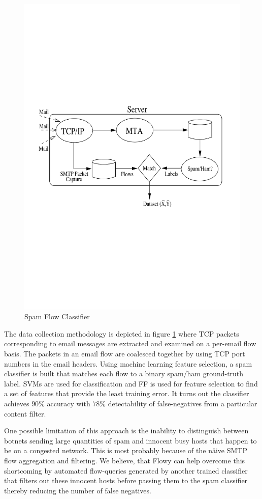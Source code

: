 \begin{figure}[h!]
\begin{center}
  \includegraphics* [width=0.7\linewidth]{figures/email-flow}
  \caption{Spam Flow Classifier \cite{rbeverly:2008}}
  \label{fig:email-flow}
\end{center}
\end{figure}
The data collection methodology is depicted in figure \ref{fig:email-flow} where \ac{TCP} packets corresponding to email messages are extracted and examined on a per-email flow basis. The packets in an email flow are coalesced together by using \ac{TCP} port numbers in the email headers. Using machine learning feature selection,  a spam classifier is built that matches each flow to a binary spam/ham ground-truth label. \ac{SVMs} \cite{vvapnik:1995} are used for classification and \ac{FF} \cite{yyang:1997} is used for feature selection to find a set of features that provide the least training error. It turns out the classifier achieves $90\%$ accuracy with $78\%$ detectability of false-negatives from a particular content filter.

One possible limitation of this approach is the inability to distinguish between botnets sending large quantities of spam and innocent busy hosts that happen to be on a congested network. This is most probably because of the   n\"aive \ac{SMTP} flow aggregation and filtering. We believe, that Flowy can help overcome this  shortcoming by automated flow-queries generated by another trained classifier that filters out these innocent hosts before passing them to the spam classifier thereby reducing the number of false negatives.

